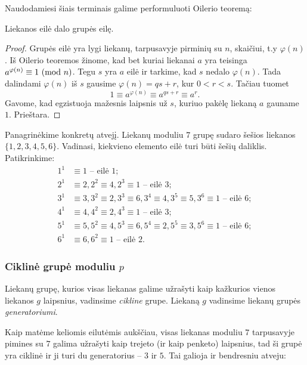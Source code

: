 \noindent Naudodamiesi šiais terminais galime performuluoti Oilerio teoremą:

\begin{thm}
  Liekanos eilė dalo grupės eilę.
\end{thm}

\begin{proof} 
  Grupės eilė yra lygi liekanų, tarpusavyje pirminių su $n$, skaičiui, t.y
  $\varphi(n)$. Iš Oilerio teoremos žinome, kad bet kuriai liekanai $a$ yra
  teisinga $a^{\varphi(n)}\equiv 1 \ (\text{mod } n)$. Tegu $s$ yra $a$ eilė ir
  tarkime, kad $s$ nedalo $\varphi(n)$. Tada dalindami $\varphi(n)$ iš $s$
  gausime $\varphi(n) = qs + r$, kur $0< r < s$. Tačiau tuomet 
  $$1\equiv a^{\varphi(n)} \equiv a^{qs + r} \equiv a^r.$$ 
  Gavome, kad egzistuoja mažesnis laipsnis už $s$, kuriuo pakėlę liekaną $a$
  gauname $1$. Prieštara.
\end{proof}

Panagrinėkime konkretų atvejį. Liekanų moduliu $7$ grupę sudaro šešios
liekanos $\{1, 2, 3, 4, 5, 6\}$. Vadinasi, kiekvieno elemento eilė turi būti
šešių daliklis. Patikrinkime:
\begin{align*}
  1^1 & \equiv 1 \text{ -- eilė } 1; \\
  2^1 & \equiv 2, 2^2 \equiv 4, 2^3 \equiv 1 \text{ -- eilė } 3; \\
  3^1 & \equiv 3, 3^2 \equiv 2, 3^3 \equiv 6, 3^4 \equiv 4, 3^5 \equiv 5,
  3^6 \equiv 1 \text{ -- eilė } 6; \\
  4^1 & \equiv 4, 4^2 \equiv 2, 4^3 \equiv 1 \text{ -- eilė } 3; \\
  5^1 & \equiv 5, 5^2 \equiv 4, 5^3 \equiv 6, 5^4 \equiv 2, 5^5 \equiv 3, 5^6
  \equiv 1 \text{ -- eilė } 6;\\
  6^1 & \equiv 6, 6^2 \equiv 1 \text{ -- eilė } 2.
\end{align*}

\subsubsection{Ciklinė grupė moduliu $p$}

\begin{api}
  Liekanų grupę, kurios visas liekanas galime užrašyti kaip kažkurios
  vienos liekanos $g$ laipsnius, vadinsime \emph{cikline} grupe. Liekaną
  $g$ vadinsime liekanų grupės \emph{generatoriumi}.
\end{api}

Kaip matėme keliomis eilutėmis aukščiau, visas liekanas moduliu $7$ tarpusavyje pimines su $7$ galima
užrašyti kaip trejeto (ir kaip penketo) laipsnius, tad ši grupė yra ciklinė
ir ji turi du generatorius -- $3$ ir $5$. Tai galioja ir bendresniu atveju:

